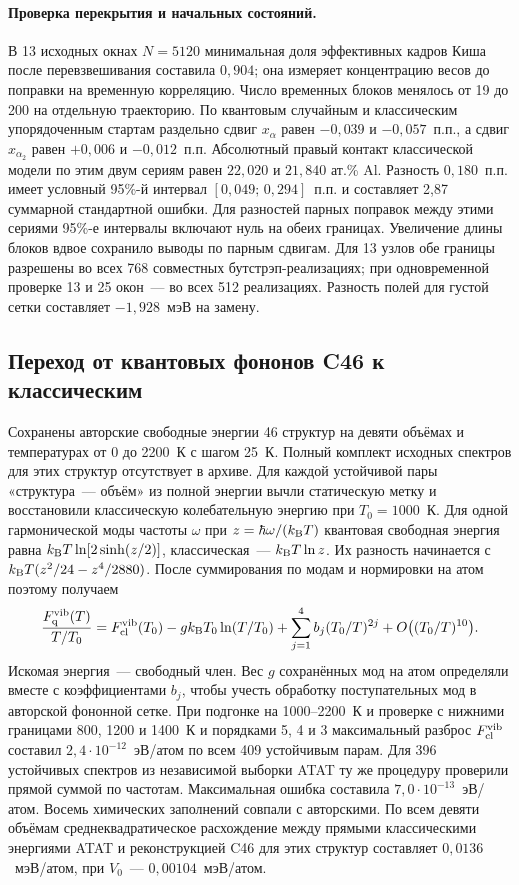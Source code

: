 \documentclass[11pt,a4paper]{article}
\begin{document}
\paragraph{Проверка перекрытия и начальных состояний.}
В 13 исходных окнах \(N=5120\) минимальная доля эффективных кадров
Киша после перевзвешивания составила \(0{,}904\); она измеряет
концентрацию весов до поправки на временную корреляцию. Число
временных блоков менялось от 19 до 200 на отдельную траекторию.
По квантовым случайным и классическим упорядоченным стартам раздельно
сдвиг \(x_\alpha\) равен \(-0{,}039\) и \(-0{,}057\)~п.п.,
а сдвиг \(x_{\alpha_2}\) равен \(+0{,}006\) и \(-0{,}012\)~п.п.
Абсолютный правый контакт классической модели по этим двум сериям
равен \(22{,}020\) и \(21{,}840\) ат.\% Al. Разность \(0{,}180\)~п.п.
имеет условный 95\%-й интервал \([0{,}049;\,0{,}294]\)~п.п. и составляет
2,87 суммарной стандартной ошибки. Для разностей парных поправок
между этими сериями 95\%-е интервалы включают нуль на обеих границах.
Увеличение длины блоков вдвое сохранило выводы по парным сдвигам.
Для 13 узлов обе границы разрешены во всех 768 совместных
бутстрэп-реализациях; при одновременной проверке 13 и 25 окон~---
во всех 512 реализациях. Разность полей для густой сетки составляет
\(-1{,}928\)~мэВ на замену.
\clearpage
\subsection*{Переход от квантовых фононов C46 к классическим}

Сохранены авторские свободные энергии 46 структур на девяти объёмах и
температурах от 0 до 2200~К с шагом 25~К. Полный комплект исходных
спектров для этих структур отсутствует в архиве. Для каждой устойчивой
пары «структура~--- объём» из полной энергии вычли статическую метку
и восстановили классическую колебательную энергию при \(T_0=1000\)~К.
Для одной гармонической моды частоты \(\omega\) при
\(z=\hbar\omega/(k_{\rm B}T)\) квантовая свободная энергия равна
\(k_{\rm B}T\ln[2\sinh(z/2)]\), классическая~--- \(k_{\rm B}T\ln z\).
Их разность начинается с \(k_{\rm B}T(z^2/24-z^4/2880)\).
После суммирования по модам и нормировки на атом поэтому получаем
\[
 \frac{F_{\rm q}^{\rm vib}(T)}{T/T_0}
 = F_{\rm cl}^{\rm vib}(T_0)
   -g k_{\rm B}T_0\ln(T/T_0)
   +\sum_{j=1}^{4} b_j(T_0/T)^{2j}
   +O\big((T_0/T)^{10}\big).
\]
Искомая энергия~--- свободный член. Вес \(g\) сохранённых мод на атом
определяли вместе с коэффициентами \(b_j\), чтобы учесть обработку
поступательных мод в авторской фононной сетке. При подгонке на
1000--2200~К и проверке с нижними границами 800, 1200 и 1400~К и
порядками 5, 4 и 3 максимальный разброс \(F_{\rm cl}^{\rm vib}\)
составил \(2{,}4\cdot10^{-12}\)~эВ/атом по всем 409 устойчивым парам.
Для 396 устойчивых спектров из независимой выборки ATAT ту же процедуру
проверили прямой суммой по частотам. Максимальная ошибка составила
\(7{,}0\cdot10^{-13}\)~эВ/атом. Восемь химических заполнений совпали
с авторскими. По всем девяти объёмам среднеквадратическое расхождение
между прямыми классическими энергиями ATAT и реконструкцией C46 для этих
структур составляет \(0{,}0136\)~мэВ/атом, при \(V_0\)~---
\(0{,}00104\)~мэВ/атом.
\end{document}
